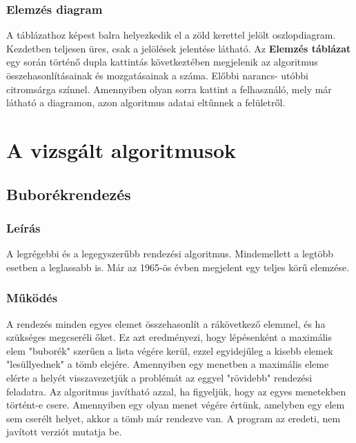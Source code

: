 \documentclass{elteikthesis}
\begin{document}
\subsubsection{Elemzés diagram}
A táblázathoz képest balra helyezkedik el a zöld kerettel jelölt oszlopdiagram. Kezdetben teljesen üres, csak a jelölések jelentése látható. Az \textbf{Elemzés táblázat} egy során történő dupla kattintás következtében megjelenik az algoritmus összehasonlításainak és mozgatásainak a száma. Előbbi narancs- utóbbi citromsárga színnel. Amennyiben olyan sorra kattint a felhasználó, mely már látható a diagramon, azon algoritmus adatai eltűnnek a felületről.

\section{A vizsgált algoritmusok}
\subsection{Buborékrendezés}
\subsubsection{Leírás}
A legrégebbi és a legegyszerűbb rendezési algoritmus. Mindemellett a legtöbb esetben a leglassabb is. Már az 1965-ös évben megjelent egy teljes körű elemzése\cite{Demuth}.
\subsubsection{Működés}
 A rendezés minden egyes elemet összehasonlít a rákövetkező elemmel, és ha szükséges megcseréli őket. Ez azt eredményezi, hogy lépésenként a maximális elem "buborék" szerűen a lista végére kerül, ezzel egyidejűleg a kisebb elemek "lesüllyednek" a tömb elejére. Amennyiben egy menetben a maximális eleme elérte a helyét visszavezetjük a problémát az eggyel "rövidebb" rendezési feladatra\cite{Fekete}. Az algoritmus javítható azzal, ha figyeljük, hogy az egyes menetekben történt-e csere. Amennyiben egy olyan menet végére értünk, amelyben egy elem sem cserélt helyet, akkor a tömb már rendezve van. A program az eredeti, nem javított verziót mutatja be.
\end{document}
